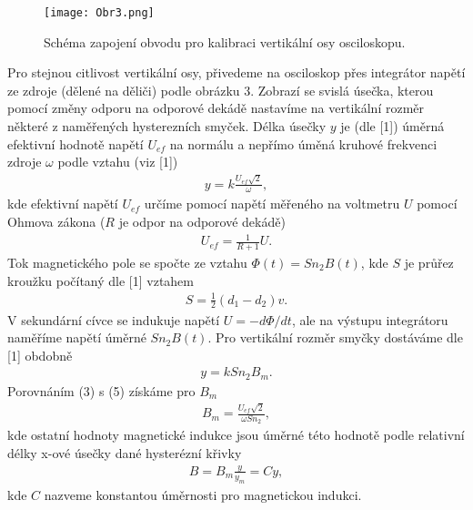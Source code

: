 \documentclass{article}
\begin{document}
\begin{figure}[h!]
\centering
\texttt{[image: Obr3.png]}
\caption{Schéma zapojení obvodu pro kalibraci vertikální osy osciloskopu.}
\end{figure}
\par Pro stejnou citlivost vertikální osy, přivedeme na osciloskop přes integrátor napětí ze zdroje (dělené na děliči) podle obrázku 3. Zobrazí se svislá úsečka, kterou pomocí změny odporu na odporové dekádě nastavíme na vertikální rozměr některé z naměřených hysterezních smyček. Délka úsečky $y$ je (dle [1]) úměrná efektivní hodnotě napětí $U_{ef}$ na normálu a nepřímo úměná kruhové frekvenci zdroje $\omega$ podle vztahu (viz [1])
\begin{align}
    y = k\frac{U_{ef} \sqrt{2}}{\omega},
\end{align}
kde efektivní napětí $U_{ef}$ určíme pomocí napětí měřeného na voltmetru $U$ pomocí Ohmova zákona ($R$ je odpor na odporové dekádě)
\begin{align}
    U_{ef} = \frac{1}{R+1}U.
\end{align}
Tok magnetického pole se spočte ze vztahu $\Phi(t) = Sn_2B(t)$, kde $S$ je průřez kroužku počítaný dle [1] vztahem
\begin{align}
    S = \frac{1}{2}(d_1 - d_2)v.
\end{align}
V sekundární cívce se indukuje napětí $U = -d\Phi/dt$, ale na výstupu integrátoru naměříme napětí úměrné $Sn_2B(t)$. Pro vertikální rozměr smyčky dostáváme dle [1] obdobně
\begin{align}
    y = kSn_2B_m.
\end{align}
Porovnáním (3) s (5) získáme pro $B_m$
\begin{align}
    B_m = \frac{U_{ef}\sqrt{2}}{\omega S n_2},
\end{align}
kde ostatní hodnoty magnetické indukce jsou úměrné této hodnotě podle relativní délky x-ové úsečky dané hysterézní křivky
\begin{align}
    B = B_m \frac{y}{y_m} = Cy,
\end{align}{}
kde $C$ nazveme konstantou úměrnosti pro magnetickou indukci.
\end{document}
